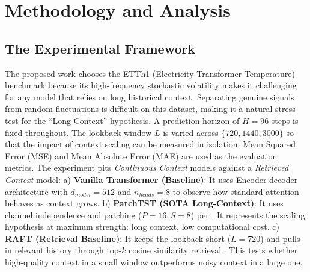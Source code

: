 \documentclass{article} %
\begin{document}
\section{Methodology and Analysis}

\subsection{The Experimental Framework}

The proposed work chooses the ETTh1 (Electricity Transformer Temperature) benchmark \citep{zhou2021informer} because its high-frequency stochastic volatility makes it challenging for any model that relies on long historical context. Separating genuine signals from random fluctuations is difficult on this dataset, making it a natural stress test for the ``Long Context'' hypothesis. A prediction horizon of $H=96$ steps is fixed throughout. The lookback window $L$ is varied across $\{720, 1440, 3000\}$ so that the impact of context scaling can be measured in isolation. Mean Squared Error (MSE) and Mean Absolute Error (MAE) are used as the evaluation metrics. The experiment pits \textit{Continuous Context} models against a \textit{Retrieved Context} model: a) \textbf{Vanilla Transformer (Baseline)}: It uses Encoder-decoder architecture with $d_{model}=512$ and $n_{heads}=8$ to observe how standard attention behaves as context grows. b) \textbf{PatchTST (SOTA Long-Context)}: It uses channel independence and patching ($P=16, S=8$) per \cite{nie2023time}. It represents the scaling hypothesis at maximum strength: long context, low computational cost. c) \textbf{RAFT (Retrieval Baseline)}: It keeps the lookback short ($L=720$) and pulls in relevant history through top-$k$ cosine similarity retrieval \citep{han2025raft}. This tests whether high-quality context in a small window outperforms noisy context in a large one.
\end{document}
